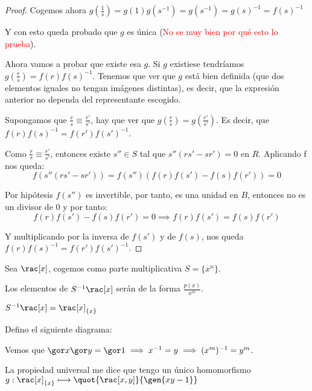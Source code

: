 \begin{proof}
		Cogemos ahora $g(\frac{1}{s})=g(1)g(s^{-1})=g(s^{-1})=g(s)^{-1}=f(s)^{-1}$
		
		Y con esto queda probado que $g$ es única (\textcolor{red}{No se muy bien por qué esto lo prueba}).
		
		Ahora vamos a probar que existe esa $g$. Si $g$ existiese tendríamos $g\left( \frac{r}{s}\right)=f(r)f(s)^{-1}$. Tenemos que ver que $g$ está bien definida (que dos elementos iguales no tengan imágenes distintas), es decir, que la expresión anterior no dependa del representante escogido.
		
		Supongamos que $\frac{r}{s} \equiv \frac{r'}{s'}$, hay que ver que $g\left(\frac{r}{s}\right)=g\left(\frac{r'}{s'}\right)$. Es decir, que $f(r)f(s)^{-1}=f(r')f(s')^{-1}$.
		
		Como  $\frac{r}{s} \equiv \frac{r'}{s'}$, entonces existe $s'' \in S$ tal que $s''(rs'-sr')=0$ en $R$. Aplicando f nos queda:
		$$f(s''(rs'-sr'))=f(s'')\left( f(r)f(s')-f(s)f(r') \right)=0$$
		
		Por hipótesis $f(s'')$ es invertible, por tanto, es una unidad en $B$, entonces no es un divisor de 0 y por tanto:
		$$f(r)f(s')-f(s)f(r')=0 \implies f(r)f(s')=f(s)f(r')$$
		
		Y multiplicando por la inversa de $f(s')$ y de $f(s)$, nos queda $f(r)f(s)^{-1}=f(r')f(s')^{-1}$.
	\end{proof}
	
	\begin{example}
		Sea $\rac[x]$, cogemos como parte multiplicativa $S=\{x^n\}$.
		
		Los elementos de $S^{-1}\rac[x]$ serán de la forma $\frac{p(x)}{x^m}$. 
		
		\notacion $S^{-1}\rac[x]=\rac[x]_{\{x\}}$
		
		Defino el siguiente diagrama:
		
		Vemos que $\cls{x}\cls{y}=\cls{1} \implies x^{-1}=y \implies (x^m)^{-1}=y^m$.
		
		La propiedad universal me dice que tengo un único homomorfismo $g: \rac[x]_{\{x\}}\longmapsto \quot{\rac[x,y]}{\gen{xy-1}}$
	
	\end{example}
	
